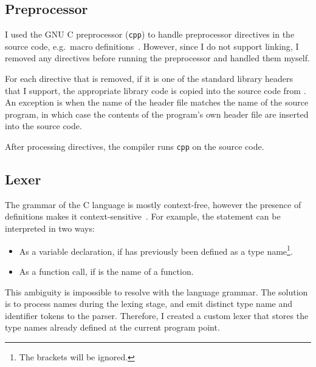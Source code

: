 \documentclass[00-main.tex]{subfiles}
\begin{document}
\subsection{Preprocessor}

I used the GNU C preprocessor (\texttt{cpp}) to handle preprocessor directives in the source code, e.g.~macro definitions~.
However, since I do not support linking, I removed any  directives before running the preprocessor and handled them myself.

For each  directive that is removed, if it is one of the standard library headers that I support, the appropriate library code is copied into the source code from .
An exception is when the name of the header file matches the name of the source program, in which case the contents of the program's own header file are inserted into the source code.

After processing  directives, the compiler runs \texttt{cpp} on the source code.

\subsection{Lexer}\label{sec:impl:lexer}

The grammar of the C language is mostly context-free, however the presence of  definitions makes it context-sensitive~.
For example, the statement  can be interpreted in two ways:
\begin{itemize}[nosep]
\item As a variable declaration, if  has previously been defined as a type name\footnote{The brackets will be ignored.}.
\item As a function call, if  is the name of a function.
\end{itemize}

This ambiguity is impossible to resolve with the language grammar. The solution is to process  names during the lexing stage, and emit distinct type name and identifier tokens to the parser.
Therefore, I created a custom lexer that stores the type names already defined at the current program point.
\end{document}
